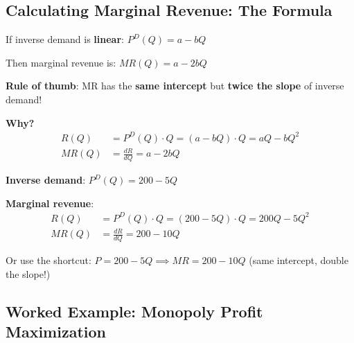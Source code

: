 \documentclass[12pt]{article}
\begin{document}
\subsection{Calculating Marginal Revenue: The Formula}

\begin{keyidea}
If inverse demand is \textbf{linear}: $P^D(Q) = a - bQ$

Then marginal revenue is: $MR(Q) = a - 2bQ$

\textbf{Rule of thumb}: MR has the \textbf{same intercept} but \textbf{twice the slope} of inverse demand!

\vspace{0.3cm}
\textbf{Why?}
\begin{align*}
R(Q) &= P^D(Q) \cdot Q = (a - bQ) \cdot Q = aQ - bQ^2 \\
MR(Q) &= \frac{dR}{dQ} = a - 2bQ
\end{align*}
\end{keyidea}

\begin{example}[Computing MR]
\textbf{Inverse demand}: $P^D(Q) = 200 - 5Q$

\textbf{Marginal revenue}:
\begin{align*}
R(Q) &= P^D(Q) \cdot Q = (200 - 5Q) \cdot Q = 200Q - 5Q^2 \\
MR(Q) &= \frac{dR}{dQ} = 200 - 10Q
\end{align*}

Or use the shortcut: $P = 200 - 5Q \implies MR = 200 - 10Q$ (same intercept, double the slope!)
\end{example}

\newpage

\subsection{Worked Example: Monopoly Profit Maximization}
\end{document}
